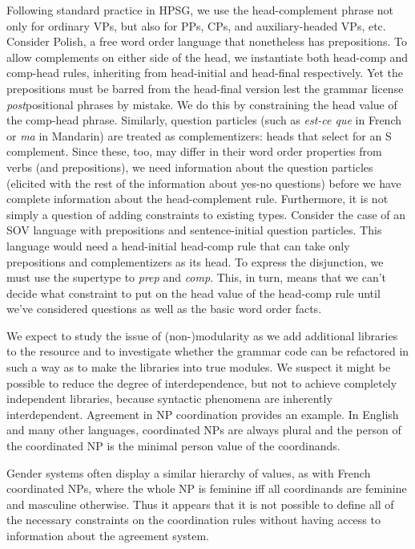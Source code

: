 \documentclass[11pt]{article}
\begin{document}
Following standard practice in HPSG, we use the head-complement phrase
not only for ordinary VPs, but also for PPs, CPs, and auxiliary-headed
VPs, etc.
Consider Polish, a free word order language that nonetheless has
prepositions.  To allow complements on either side of the head,
we instantiate both head-comp and comp-head rules,
inheriting from head-initial and head-final respectively. Yet the
prepositions must be barred from the head-final version lest the
grammar license {\it post}positional phrases by mistake. We do this by
constraining the {\sc head} value of the comp-head phrase.  Similarly,
question particles (such as {\it est-ce que} in French or {\it ma} in
Mandarin) are treated as complementizers: heads that select for an S
complement.  Since these, too, may differ in their word order
properties from verbs (and prepositions), we need information about
the question particles (elicited with the rest of the information
about yes-no questions) before we have complete information about the
head-complement rule.  Furthermore, it is not simply a question of
adding constraints to existing types. Consider the case of an SOV
language with prepositions and sentence-initial question particles.
This language would need a head-initial head-comp rule that can take
only prepositions and complementizers as its head.  To express the
disjunction, we must use the supertype to {\it prep} and {\it
comp}.  This, in turn, means that we can't decide what constraint to
put on the head value of the head-comp rule until we've considered
questions as well as the basic word order facts.

We expect to study the issue of (non-)modularity as we add additional
libraries to the resource and to investigate whether the grammar code
can be refactored in such a way as to make the libraries into true
modules.  We suspect it might be possible to reduce the degree of
interdependence, but not to achieve completely independent libraries,
because syntactic phenomena are inherently interdependent.  Agreement
in NP coordination provides an example. In English and many other
languages, coordinated NPs are always plural and the person of the coordinated
NP is the minimal person value of the coordinands.

%
Gender systems often display a similar hierarchy
of values, as with French coordinated NPs, where the whole NP is feminine
iff all coordinands are feminine and masculine otherwise.  Thus
it appears that it is not possible to define all of the necessary
constraints on the coordination rules without having access to information
about the agreement system.  
\end{document}
